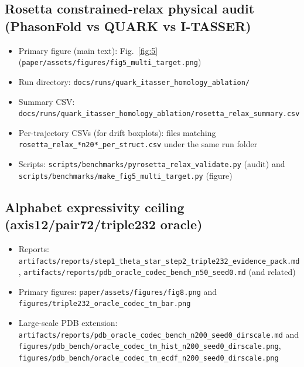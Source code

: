 \subsection*{Rosetta constrained-relax physical audit (PhasonFold vs QUARK vs I-TASSER)}
\begin{itemize}
  \item Primary figure (main text): Fig.~\ref{fig:5} (\texttt{paper/assets/figures/fig5\_multi\_target.png})
  \item Run directory: \texttt{docs/runs/quark\_itasser\_homology\_ablation/}
  \item Summary CSV: \texttt{docs/runs/quark\_itasser\_homology\_ablation/rosetta\_relax\_summary.csv}
  \item Per-trajectory CSVs (for drift boxplots): files matching \texttt{rosetta\_relax\_*n20*\_per\_struct.csv} under the same run folder
  \item Scripts: \texttt{scripts/benchmarks/pyrosetta\_relax\_validate.py} (audit) and \texttt{scripts/benchmarks/make\_fig5\_multi\_target.py} (figure)
\end{itemize}

\subsection*{Alphabet expressivity ceiling (axis12/pair72/triple232 oracle)}
\begin{itemize}
  \item Reports: \texttt{artifacts/reports/step1\_theta\_star\_step2\_triple232\_evidence\_pack.md}, \texttt{artifacts/reports/pdb\_oracle\_codec\_bench\_n50\_seed0.md} (and related)
  \item Primary figures: \texttt{paper/assets/figures/fig8.png} and \texttt{figures/triple232\_oracle\_codec\_tm\_bar.png}
  \item Large-scale PDB extension: \texttt{artifacts/reports/pdb\_oracle\_codec\_bench\_n200\_seed0\_dirscale.md} and \texttt{figures/pdb\_bench/oracle\_codec\_tm\_hist\_n200\_seed0\_dirscale.png}, \texttt{figures/pdb\_bench/oracle\_codec\_tm\_ecdf\_n200\_seed0\_dirscale.png}
\end{itemize}

